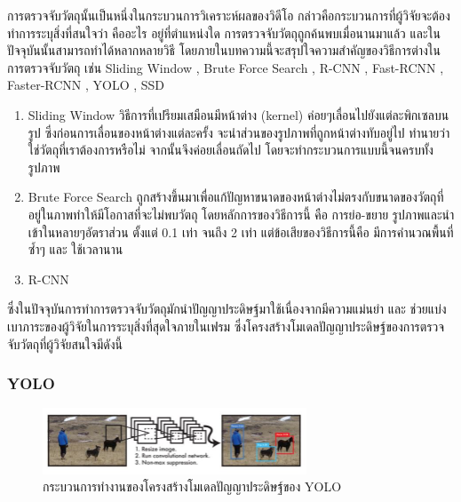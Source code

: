 การตรวจจับวัตถุนั้นเป็นหนึ่งในกระบวนการวิเคราะห์ผลของวิดีโอ กล่าวคือกระบวนการที่ผู้วิจัยจะต้องทำการระบุสิ่งที่สนใจว่า คืออะไร อยู่ที่ตำแหน่งใด 	การตรวจจับวัตถุถูกค้นพบเมื่อนานมาแล้ว และในปัจจุบันนั้นสามารถทำได้หลากหลายวิธี โดยภายในบทความนี้จะสรุปใจความสำคัญของวิธีการต่างในการตรวจจับวัตถุ เช่น Sliding Window , Brute Force Search , R-CNN , Fast-RCNN , Faster-RCNN , YOLO , SSD 
\begin{enumerate}
	\item Sliding Window วิธีการที่เปรียมเสมือนมีหน้าต่าง (kernel) ค่อยๆเลื่อนไปยังแต่ละพิกเซลบนรูป ซึ่งก่อนการเลื่อนของหน้าต่างแต่ละครั้ง จะนำส่วนของรูปภาพที่ถูกหน้าต่างทับอยู่ไป	ทำนายว่าใช่วัตถุที่เราต้องการหรือไม่ จากนั้นจึงค่อยเลื่อนถัดไป โดยจะทำกระบวนการแบบนี้จนครบทั้งรูปภาพ
	\item Brute Force Search ถูกสร้างขึ้นมาเพื่อแก้ปัญหาขนาดของหน้าต่างไม่ตรงกับขนาดของวัตถุที่อยู่ในภาพทำให้มีโอกาสที่จะไม่พบวัตถุ โดยหลักการของวิธีการนี้ คือ การย่อ-ขยาย รูปภาพและนำเข้าในหลายๆอัตราส่วน ตั้งแต่ 0.1 เท่า จนถึง 2 เท่า แต่ข้อเสียของวิธีการนี้คือ มีการคำนวณพื้นที่ซ้ำๆ และ ใช้เวลานาน
	\item R-CNN
\end{enumerate}




 



ซึ่งในปัจจุบันการทำการตรวจจับวัตถุมักนำปัญญาประดิษฐ์มาใช้เนื่องจากมีความแม่นยำ และ ช่วยแบ่งเบาภาระของผู้วิจัยในการระบุสิ่งที่สุดใจภายในเฟรม ซึ่งโครงสร้างโมเดลปัญญาประดิษฐ์ของการตรวจจับวัตถุที่ผู้วิจัยสนใจมีดังนี้

\subsubsection*{YOLO}
\begin{figure}[!ht]
    \centering
    \includegraphics[width=0.7\textwidth]{chapter2/images/yolo.jpg}
    \caption{กระบวนการทำงานของโครงสร้างโมเดลปัญญาประดิษฐ์ของ YOLO}
    \label{fig:yolo}
\end{figure}

